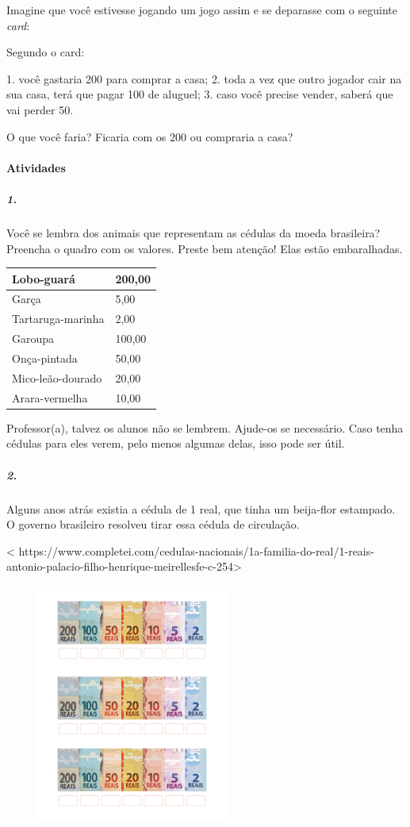 Imagine que você estivesse jogando um jogo assim e se deparasse com o seguinte
\emph{card}:

Segundo o card:

1. você gastaria 200 para comprar a casa;
2. toda a vez que outro jogador cair na sua casa, terá que pagar 100 de aluguel;
3. caso você precise vender, saberá que vai
perder 50. 

O que você faria? Ficaria com os 200 ou compraria a casa?


\paragraph{Atividades }\label{atividades-4}

\subparagraph{1.}\label{section-57}

Você se lembra dos animais que representam as cédulas da moeda
brasileira? Preencha o quadro com os valores. Preste bem atenção!
Elas estão embaralhadas.

\begin{longtable}[]{@{}ll@{}}
\toprule
Lobo-guará & 200,00\tabularnewline
\midrule
\endhead
Garça & 5,00\tabularnewline
Tartaruga-marinha & 2,00\tabularnewline
Garoupa & 100,00\tabularnewline
Onça-pintada & 50,00\tabularnewline
Mico-leão-dourado & 20,00\tabularnewline
Arara-vermelha & 10,00\tabularnewline
\bottomrule
\end{longtable}

Professor(a), talvez os alunos não se lembrem. Ajude-os se necessário. Caso tenha cédulas para eles verem, pelo menos algumas delas, isso pode ser útil.

\subparagraph{2.}\label{section-58}

Alguns anos atrás existia a cédula de 1 real, que tinha um beija-flor
estampado. O governo brasileiro resolveu tirar essa cédula de circulação.

\textless{}
https://www.completei.com/cedulas-nacionais/1a-familia-do-real/1-reais-antonio-palacio-filho-henrique-meirellesfe-c-254\textgreater{}

\includegraphics[width=3.30208in,height=3.08528in]{media/image70.png}

